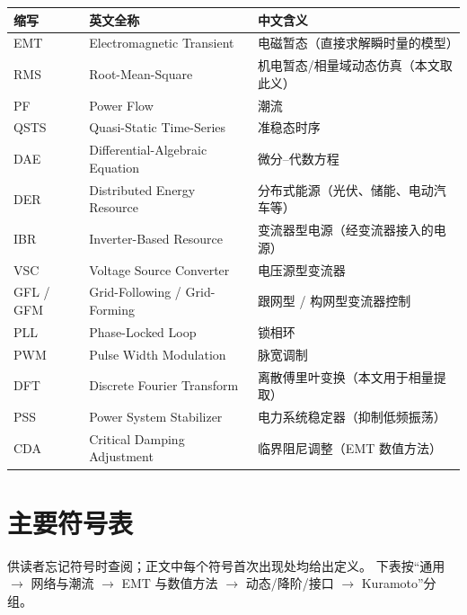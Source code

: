 \begin{table}[H]
\centering
\small
\begin{tabularx}{\textwidth}{@{}l l X@{}}
\toprule
缩写 & 英文全称 & 中文含义 \\
\midrule
EMT & Electromagnetic Transient & 电磁暂态（直接求解瞬时量的模型） \\
RMS & Root-Mean-Square & 机电暂态/相量域动态仿真（本文取此义） \\
PF & Power Flow & 潮流 \\
QSTS & Quasi-Static Time-Series & 准稳态时序 \\
DAE & Differential-Algebraic Equation & 微分--代数方程 \\
DER & Distributed Energy Resource & 分布式能源（光伏、储能、电动汽车等） \\
IBR & Inverter-Based Resource & 变流器型电源（经变流器接入的电源） \\
VSC & Voltage Source Converter & 电压源型变流器 \\
GFL / GFM & Grid-Following / Grid-Forming & 跟网型 / 构网型变流器控制 \\
PLL & Phase-Locked Loop & 锁相环 \\
PWM & Pulse Width Modulation & 脉宽调制 \\
DFT & Discrete Fourier Transform & 离散傅里叶变换（本文用于相量提取） \\
PSS & Power System Stabilizer & 电力系统稳定器（抑制低频振荡） \\
CDA & Critical Damping Adjustment & 临界阻尼调整（EMT 数值方法） \\
\bottomrule
\end{tabularx}
\end{table}

\section{主要符号表}
\label{app:symbols}

供读者忘记符号时查阅；正文中每个符号首次出现处均给出定义。
下表按“通用 $\to$ 网络与潮流 $\to$ EMT 与数值方法 $\to$ 动态/降阶/接口 $\to$ Kuramoto”分组。


